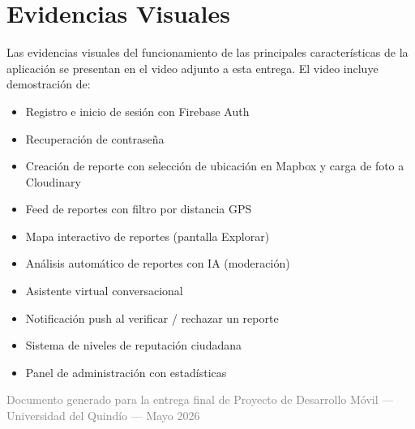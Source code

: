 \documentclass[12pt,a4paper]{article}
\begin{document}
\section{Evidencias Visuales}

Las evidencias visuales del funcionamiento de las principales características de la aplicación se presentan en el video adjunto a esta entrega. El video incluye demostración de:

\begin{itemize}[leftmargin=1.5em]
    \item Registro e inicio de sesión con Firebase Auth
    \item Recuperación de contraseña
    \item Creación de reporte con selección de ubicación en Mapbox y carga de foto a Cloudinary
    \item Feed de reportes con filtro por distancia GPS
    \item Mapa interactivo de reportes (pantalla Explorar)
    \item Análisis automático de reportes con IA (moderación)
    \item Asistente virtual conversacional
    \item Notificación push al verificar / rechazar un reporte
    \item Sistema de niveles de reputación ciudadana
    \item Panel de administración con estadísticas
\end{itemize}

\vfill
\begin{center}
    \textcolor{gray}{\small Documento generado para la entrega final de Proyecto de Desarrollo Móvil --- Universidad del Quindío --- Mayo 2026}
\end{center}
\end{document}
